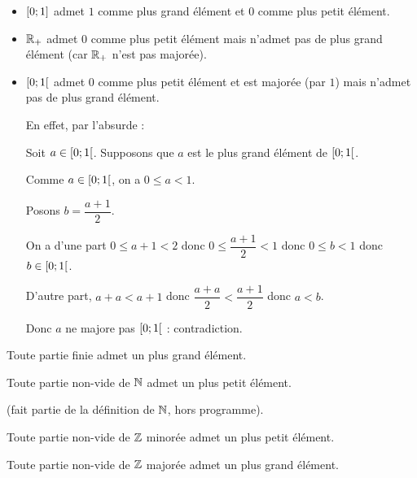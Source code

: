 \begin{ex}
\begin{itemize}
\item \(\left[0;1\right]\) admet \(1\) comme plus grand élément et \(0\) comme plus petit élément.

\item \(\mathbb{R}_+\) admet \(0\) comme plus petit élément mais n'admet pas de plus grand élément (car \(\mathbb{R}_+\) n'est pas majorée).

\item \(\left[0;1\right[\) admet \(0\) comme plus petit élément et est majorée (par \(1\)) mais n'admet pas de plus grand élément.

En effet, par l'absurde :

Soit \(a\in\left[0;1\right[\). Supposons que \(a\) est le plus grand élément de \(\left[0;1\right[\).

Comme \(a\in\left[0;1\right[\), on a \(0\leq a<1\).

Posons \(b=\dfrac{a+1}{2}\).

On a d'une part \(0\leq a+1<2\) donc \(0\leq\dfrac{a+1}{2}<1\) donc \(0\leq b<1\) donc \(b\in\left[0;1\right[\).

D'autre part, \(a+a<a+1\) donc \(\dfrac{a+a}{2}<\dfrac{a+1}{2}\) donc \(a<b\).

Donc \(a\) ne majore pas \(\left[0;1\right[\) : contradiction.
\end{itemize}
\end{ex}

\begin{rem}
Toute partie finie admet un plus grand élément.
\end{rem}

\begin{theo}
Toute partie non-vide de \(\mathbb{N}\) admet un plus petit élément.
\end{theo}

\begin{dem}
 (fait partie de la définition de \(\mathbb{N}\), hors programme).
\end{dem}

\begin{cor}
Toute partie non-vide de \(\mathbb{Z}\) minorée admet un plus petit élément.

Toute partie non-vide de \(\mathbb{Z}\) majorée admet un plus grand élément.
\end{cor}

